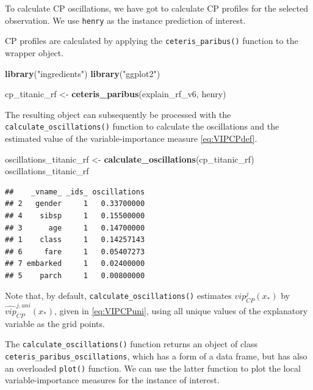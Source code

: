 \documentclass[12pt,]{krantz}
\newenvironment{Shaded}{\begin{snugshade}}{\end{snugshade}}
\newcommand{\KeywordTok}[1]{\textcolor[rgb]{0.13,0.29,0.53}{\textbf{#1}}}
\newcommand{\NormalTok}[1]{#1}
\newcommand{\StringTok}[1]{\textcolor[rgb]{0.31,0.60,0.02}{#1}}
\theoremstyle{definition}
\theoremstyle{definition}
\theoremstyle{definition}
\theoremstyle{remark}
\begin{document}
To calculate CP oscillations, we have got to calculate CP profiles for
the selected observation. We use \texttt{henry} as the instance
prediction of interest.

CP profiles are calculated by applying the \texttt{ceteris\_paribus()}
function to the wrapper object.

\begin{Shaded}
\begin{Highlighting}[]
\KeywordTok{library}\NormalTok{(}\StringTok{"ingredients"}\NormalTok{)}
\KeywordTok{library}\NormalTok{(}\StringTok{"ggplot2"}\NormalTok{)}

\NormalTok{cp_titanic_rf <-}\StringTok{ }\KeywordTok{ceteris_paribus}\NormalTok{(explain_rf_v6, henry)}
\end{Highlighting}
\end{Shaded}

The resulting object can subsequently be processed with the
\texttt{calculate\_oscillations()} function to calculate the
oscillations and the estimated value of the variable-importance measure
\eqref{eq:VIPCPdef}.

\begin{Shaded}
\begin{Highlighting}[]
\NormalTok{oscillations_titanic_rf <-}\StringTok{ }\KeywordTok{calculate_oscillations}\NormalTok{(cp_titanic_rf)}
\NormalTok{oscillations_titanic_rf}
\end{Highlighting}
\end{Shaded}

\begin{verbatim}
##    _vname_ _ids_ oscillations
## 2   gender     1   0.33700000
## 4    sibsp     1   0.15500000
## 3      age     1   0.14700000
## 1    class     1   0.14257143
## 6     fare     1   0.05407273
## 7 embarked     1   0.02400000
## 5    parch     1   0.00800000
\end{verbatim}

Note that, by default, \texttt{calculate\_oscillations()} estimates
\(vip_{CP}^j(x_*)\) by \(\widehat{vip}_{CP}^{j,uni}(x_*)\), given in
\eqref{eq:VIPCPuni}, using all unique values of the explanatory variable
as the grid points.

The \texttt{calculate\_oscillations()} function returns an object of
class \texttt{ceteris\_paribus\_oscillations}, which has a form of a
data frame, but has also an overloaded \texttt{plot()} function. We can
use the latter function to plot the local variable-importance measures
for the instance of interest.
\end{document}
